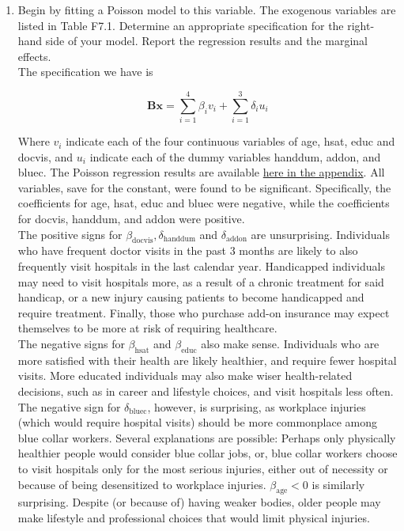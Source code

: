 \documentclass{article}
\begin{document}
\begin{enumerate}[label=(\alph*)]
\item Begin by fitting a Poisson model to this variable. The exogenous variables are listed in Table F7.1. Determine an appropriate specification for the right-hand side of your model. Report the regression results and the marginal effects.\\

The specification we have is 

	$$ \textbf{Bx}= \sum_{i=1}^4\beta_i v_i + \sum_{i=1}^3 \delta_i u_i$$

Where $v_i$ indicate each of the four continuous variables of age, hsat, educ and docvis, and $u_i$ indicate each of the dummy variables handdum, addon, and bluec. The Poisson regression results are available \hyperlink{poisson}{here in the appendix}. All variables, save for the constant, were found to be significant. Specifically, the coefficients for age, hsat, educ and bluec were negative, while the coefficients for docvis, handdum, and addon were positive.\\

The positive signs for $\beta_{\text{docvis}}, \delta_{\text{handdum}}$ and $\delta_{\text{addon}}$ are unsurprising. Individuals who have frequent doctor visits in the past 3 months are likely to also frequently visit hospitals in the last calendar year. Handicapped individuals may need to visit hospitals more, as a result of a chronic treatment for said handicap, or a new injury causing patients to become handicapped and require treatment. Finally, those who purchase add-on insurance may expect themselves to be more at risk of requiring healthcare. \\

The negative signs for $\beta_{\text{hsat}}$ and $\beta_{\text{educ}}$ also make sense. Individuals who are more satisfied with their health are likely healthier, and require fewer hospital visits. More educated individuals may also make wiser health-related decisions, such as in career and lifestyle choices, and visit hospitals less often. The negative sign for $\delta_{\text{bluec}}$, however, is surprising, as workplace injuries (which would require hospital visits) should be more commonplace among blue collar workers. Several explanations are possible: Perhaps only physically healthier people would consider blue collar jobs, or, blue collar workers choose to visit hospitals only for the most serious injuries, either out of necessity or because of being desensitized to workplace injuries. $\beta_{\text{age}} < 0$ is similarly surprising. Despite (or because of) having weaker bodies, older people may make lifestyle and professional choices that would limit physical injuries.\\
 

\end{enumerate}
\end{document}
